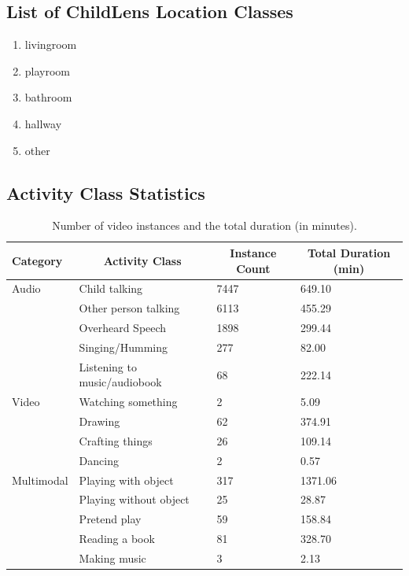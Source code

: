 \documentclass[
  man,floatsintext]{apa6}
\providecommand{\tightlist}{%
  \setlength{\itemsep}{0pt}\setlength{\parskip}{0pt}}
\begin{document}
\subsection{List of ChildLens Location Classes}\label{list-of-childlens-location-classes}

\begin{enumerate}
\def\labelenumi{\arabic{enumi}.}
\tightlist
\item
  livingroom
\item
  playroom
\item
  bathroom
\item
  hallway
\item
  other
\end{enumerate}

\subsection{Activity Class Statistics}\label{activity-class-statistics}

\begin{table}[tbp]

\begin{center}
\begin{threeparttable}

\caption{\label{tab:activity-classes-statistics}Number of video instances and the total duration (in minutes).}

\begin{tabular}{llll}
\toprule
Category & \multicolumn{1}{c}{Activity Class} & \multicolumn{1}{c}{Instance Count} & \multicolumn{1}{c}{Total Duration (min)}\\
\midrule
Audio & Child talking & 7447 & 649.10\\
 & Other person talking & 6113 & 455.29\\
 & Overheard Speech & 1898 & 299.44\\
 & Singing/Humming & 277 & 82.00\\
 & Listening to music/audiobook & 68 & 222.14\\
Video & Watching something & 2 & 5.09\\
 & Drawing & 62 & 374.91\\
 & Crafting things & 26 & 109.14\\
 & Dancing & 2 & 0.57\\
Multimodal & Playing with object & 317 & 1371.06\\
 & Playing without object & 25 & 28.87\\
 & Pretend play & 59 & 158.84\\
 & Reading a book & 81 & 328.70\\
 & Making music & 3 & 2.13\\
\bottomrule
\end{tabular}

\end{threeparttable}
\end{center}

\end{table}
\end{document}
